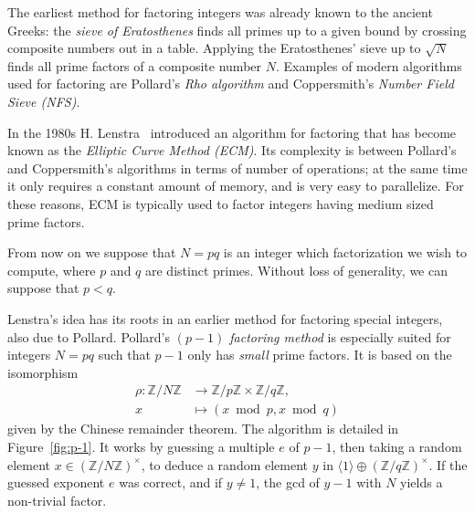 \documentclass[10pt]{article}
\theoremstyle{plain}
\theoremstyle{definition}
\begin{document}
The earliest method for factoring integers was already known to the
ancient Greeks: the \emph{sieve of Eratosthenes} finds all primes up
to a given bound by crossing composite numbers out in a table. %
Applying the Eratosthenes' sieve up to $\sqrt{N}$ finds all prime
factors of a composite number $N$. %
Examples of modern algorithms used for factoring are Pollard's
\emph{Rho algorithm} and Coppersmith's \emph{Number Field Sieve
  (NFS)}.

In the 1980s H. Lenstra~\cite{lenstra87} introduced an algorithm for
factoring that has become known as the \emph{Elliptic Curve Method
  (ECM)}. %
Its complexity is between Pollard's and Coppersmith's algorithms in
terms of number of operations; at the same time it only requires a
constant amount of memory, and is very easy to parallelize. %
For these reasons, ECM is typically used to factor integers having
medium sized prime factors.

From now on we suppose that $N=pq$ is an integer which factorization
we wish to compute, where $p$ and $q$ are distinct primes. %
Without loss of generality, we can suppose that $p<q$.

Lenstra's idea has its roots in an earlier method for factoring
special integers, also due to Pollard. %
Pollard's \emph{$(p-1)$ factoring method} is especially suited for
integers $N=pq$ such that $p-1$ only has \emph{small} prime factors. %
It is based on the isomorphism
\begin{align*}
  \rho : ℤ/Nℤ &\to ℤ/pℤ × ℤ/qℤ,\\
  x &\mapsto (x \bmod p, x \bmod q)
\end{align*}
given by the Chinese remainder theorem. %
The algorithm is detailed in Figure~\ref{fig:p-1}. %
It works by guessing a multiple $e$ of $p-1$, then taking a random
element $x∈(ℤ/Nℤ)^{×}$, to deduce a random element $y$ in
$〈1〉⊕(ℤ/qℤ)^{×}$. If the guessed exponent $e$ was correct, and if
$y≠1$, the gcd of $y-1$ with $N$ yields a non-trivial factor. %
\end{document}
